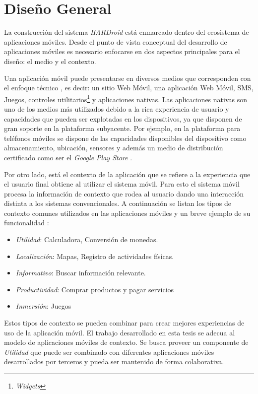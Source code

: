\section{Diseño General}

\label{sec52:dise=0000F1o}La construcción del sistema \emph{HARDroid
}está enmarcado dentro del ecosistema de aplicaciones móviles. Desde
el punto de vista conceptual del desarrollo de aplicaciones móviles
es necesario enfocarse en dos aspectos principales para el diseño:
el medio y el contexto.

Una aplicación móvil puede presentarse en diversos medios que corresponden
con el enfoque técnico \cite{Fling2009}, es decir: un sitio Web Móvil,
una aplicación Web Móvil, SMS, Juegos, controles utilitarios\footnote{\emph{Widgets}}
y aplicaciones nativas. Las aplicaciones nativas son uno de los medios
más utilizados debido a la rica experiencia de usuario y capacidades
que pueden ser explotadas en los dispositivos, ya que disponen de
gran soporte en la plataforma subyacente. Por ejemplo, en la plataforma
para teléfonos móviles \emph{ }se dispone de las capacidades
disponibles del dispositivo como almacenamiento, ubicación, sensores
y además un medio de distribución certificado como ser el \emph{Google
Play Store} \cite{Google2016p}. 

Por otro lado, está el contexto de la aplicación que se refiere a
la experiencia que el usuario final obtiene al utilizar el sistema
móvil. Para esto el sistema móvil procesa la información de contexto
que rodea al usuario dando una interacción distinta a los sistemas
convencionales. A continuación se listan los tipos de contexto comunes
utilizados en las aplicaciones móviles y un breve ejemplo de su funcionalidad
\cite{Fling2009}:
\begin{itemize}
\item \emph{Utilidad}: Calculadora, Conversión de monedas.
\item \emph{Localización}: Mapas, Registro de actividades físicas.
\item \emph{Informativo}: Buscar información relevante.
\item \emph{Productividad}: Comprar productos y pagar servicios
\item \emph{Inmersión}: Juegos 
\end{itemize}
Estos tipos de contexto se pueden combinar para crear mejores experiencias
de uso de la aplicación móvil. El trabajo desarrollado en esta tesis
se adecua al modelo de aplicaciones móviles de contexto. Se busca
proveer un componente de \emph{Utilidad} que puede ser combinado con
diferentes aplicaciones móviles desarrollados por terceros y pueda
ser mantenido de forma colaborativa. 

